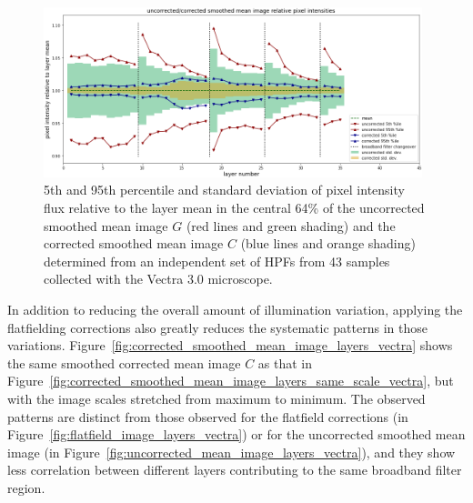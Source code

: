 \documentclass[letterpaper,11pt]{article}
\newcommand{\reffig}[1]{Figure~\ref{#1}}
\begin{document}
\begin{figure}[!ht]
\centering
\includegraphics[width=0.98\textwidth]{images/results/illumination_variation_reduction_vectra}
\caption{\footnotesize 5th and 95th percentile and standard deviation of pixel intensity flux relative to the layer mean in the central 64\% of the uncorrected smoothed mean image $G$ (red lines and green shading) and the corrected smoothed mean image $C$ (blue lines and orange shading) determined from an independent set of HPFs from 43 samples collected with the Vectra 3.0 microscope.}
\label{fig:illumination_variation_reduction_vectra}
\end{figure} 

In addition to reducing the overall amount of illumination variation, applying the flatfielding corrections also greatly reduces the systematic patterns in those variations. \reffig{fig:corrected_smoothed_mean_image_layers_vectra} shows the same smoothed corrected mean image $C$ as that in \reffig{fig:corrected_smoothed_mean_image_layers_same_scale_vectra}, but with the image scales stretched from maximum to minimum. The observed patterns are distinct from those observed for the flatfield corrections (in \reffig{fig:flatfield_image_layers_vectra}) or for the uncorrected smoothed mean image (in \reffig{fig:uncorrected_mean_image_layers_vectra}), and they show less correlation between different layers contributing to the same broadband filter region.
\end{document}
